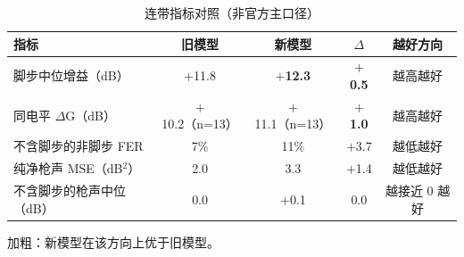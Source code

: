 \begin{table}[htbp]\centering
\caption{连带指标对照（非官方主口径）}\label{tab:nm_summary}
{\small\begin{threeparttable}
\begin{tabularx}{\linewidth}{Lcccc}\toprule
指标 & 旧模型 & 新模型 & $\Delta$ & 越好方向 \\
\midrule
脚步中位增益（dB） & $+$11.8 & \textbf{$+$12.3} & \textbf{$+$0.5} & 越高越好 \\
同电平 $\Delta$G（dB） & $+$10.2（n=13） & $+$11.1（n=13） & \textbf{$+$1.0} & 越高越好 \\
不含脚步的非脚步 FER & 7\% & 11\% & $+$3.7 & 越低越好 \\
纯净枪声 MSE（dB$^{2}$） & 2.0 & 3.3 & $+$1.4 & 越低越好 \\
不含脚步的枪声中位（dB） & 0.0 & $+$0.1 & 0.0 & 越接近 0 越好 \\
\bottomrule\end{tabularx}
\begin{tablenotes}\footnotesize\item 加粗：新模型在该方向上优于旧模型。\end{tablenotes}\end{threeparttable}}
\end{table}
